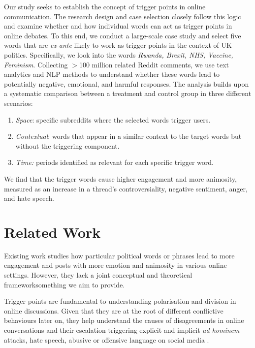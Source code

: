 Our study seeks to establish the concept of trigger points in online communication. The research design and case selection closely follow this logic and examine whether and how individual words can act as trigger points in online debates. To this end, we conduct a large-scale case study and select five words that are \emph{ex-ante} likely to work as trigger points in the context of UK politics. Specifically, we look into the words \textit{Rwanda, Brexit, NHS, Vaccine, Feminism}. Collecting $>$100 million related Reddit comments, we use text analytics and NLP methods to understand whether these words lead to potentially negative, emotional, and harmful responses. The analysis builds upon a systematic comparison between a treatment and control group in three different scenarios:
\begin{enumerate}
    \item \textit{Space}: specific subreddits where the selected words trigger users.
    \item \textit{Contextual}: words that appear in a similar context to the target words but without the triggering component.
    \item \textit{Time:} periods identified as relevant for each specific trigger word. 
\end{enumerate}

We find that the trigger words cause higher engagement and more animosity, measured as an increase in a thread's controversiality, negative sentiment, anger, and hate speech.

\section{Related Work}
Existing work studies how particular political words or phrases lead to more engagement \cite{Brady17, Hameleeres21} and posts with more emotion and animosity \cite{friedman2004positive, Martin_Huck_Williams_Hull_Hull_2021, Schroth2005stones, Rho20} in various online settings. However, they lack a joint conceptual and theoretical framework\textemdash something we aim to provide.

Trigger points are fundamental to understanding polarisation and division in online discussions. Given that they are at the root of different conflictive behaviours later on, they help understand the causes of disagreements in online conversations \cite{de-kock-vlachos-2021-beg2} and their escalation \cite{de-kock-vlachos-2022-disagree,van-der-meer-etal-2023-differences} triggering explicit and implicit \textit{ad hominem} attacks, hate speech, abusive or offensive language on social media \cite{Talat2016HatefulSO, davidson2017automated,basile2019semeval,ousidhoum-etal-2019-multilingual,sap-etal-2019-social2, elsherief-etal-2021-latent2, ocampo-etal-2023-depth}.


